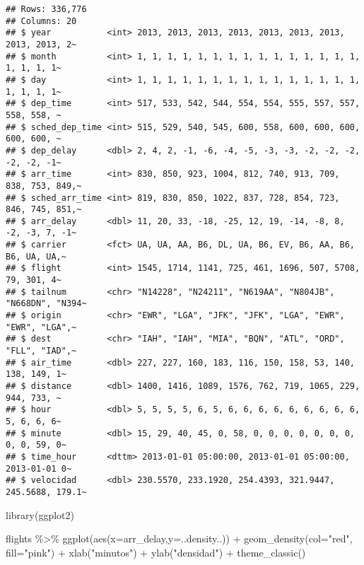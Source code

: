 \documentclass[
]{article}
\newenvironment{Shaded}{\begin{snugshade}}{\end{snugshade}}
\newcommand{\AttributeTok}[1]{\textcolor[rgb]{0.77,0.63,0.00}{#1}}
\newcommand{\FunctionTok}[1]{\textcolor[rgb]{0.00,0.00,0.00}{#1}}
\newcommand{\NormalTok}[1]{#1}
\newcommand{\SpecialCharTok}[1]{\textcolor[rgb]{0.00,0.00,0.00}{#1}}
\newcommand{\StringTok}[1]{\textcolor[rgb]{0.31,0.60,0.02}{#1}}
\begin{document}
\begin{verbatim}
## Rows: 336,776
## Columns: 20
## $ year           <int> 2013, 2013, 2013, 2013, 2013, 2013, 2013, 2013, 2013, 2~
## $ month          <int> 1, 1, 1, 1, 1, 1, 1, 1, 1, 1, 1, 1, 1, 1, 1, 1, 1, 1, 1~
## $ day            <int> 1, 1, 1, 1, 1, 1, 1, 1, 1, 1, 1, 1, 1, 1, 1, 1, 1, 1, 1~
## $ dep_time       <int> 517, 533, 542, 544, 554, 554, 555, 557, 557, 558, 558, ~
## $ sched_dep_time <int> 515, 529, 540, 545, 600, 558, 600, 600, 600, 600, 600, ~
## $ dep_delay      <dbl> 2, 4, 2, -1, -6, -4, -5, -3, -3, -2, -2, -2, -2, -2, -1~
## $ arr_time       <int> 830, 850, 923, 1004, 812, 740, 913, 709, 838, 753, 849,~
## $ sched_arr_time <int> 819, 830, 850, 1022, 837, 728, 854, 723, 846, 745, 851,~
## $ arr_delay      <dbl> 11, 20, 33, -18, -25, 12, 19, -14, -8, 8, -2, -3, 7, -1~
## $ carrier        <fct> UA, UA, AA, B6, DL, UA, B6, EV, B6, AA, B6, B6, UA, UA,~
## $ flight         <int> 1545, 1714, 1141, 725, 461, 1696, 507, 5708, 79, 301, 4~
## $ tailnum        <chr> "N14228", "N24211", "N619AA", "N804JB", "N668DN", "N394~
## $ origin         <chr> "EWR", "LGA", "JFK", "JFK", "LGA", "EWR", "EWR", "LGA",~
## $ dest           <chr> "IAH", "IAH", "MIA", "BQN", "ATL", "ORD", "FLL", "IAD",~
## $ air_time       <dbl> 227, 227, 160, 183, 116, 150, 158, 53, 140, 138, 149, 1~
## $ distance       <dbl> 1400, 1416, 1089, 1576, 762, 719, 1065, 229, 944, 733, ~
## $ hour           <dbl> 5, 5, 5, 5, 6, 5, 6, 6, 6, 6, 6, 6, 6, 6, 6, 5, 6, 6, 6~
## $ minute         <dbl> 15, 29, 40, 45, 0, 58, 0, 0, 0, 0, 0, 0, 0, 0, 0, 59, 0~
## $ time_hour      <dttm> 2013-01-01 05:00:00, 2013-01-01 05:00:00, 2013-01-01 0~
## $ velocidad      <dbl> 230.5570, 233.1920, 254.4393, 321.9447, 245.5688, 179.1~
\end{verbatim}

\begin{Shaded}
\begin{Highlighting}[]
  \FunctionTok{library}\NormalTok{(ggplot2)}

\NormalTok{  flights }\SpecialCharTok{\%\textgreater{}\%}
    \FunctionTok{ggplot}\NormalTok{(}\FunctionTok{aes}\NormalTok{(}\AttributeTok{x=}\NormalTok{arr\_delay,}\AttributeTok{y=}\NormalTok{..density..)) }\SpecialCharTok{+} 
    \FunctionTok{geom\_density}\NormalTok{(}\AttributeTok{col=}\StringTok{"red"}\NormalTok{, }\AttributeTok{fill=}\StringTok{"pink"}\NormalTok{) }\SpecialCharTok{+}
    \FunctionTok{xlab}\NormalTok{(}\StringTok{"minutos"}\NormalTok{) }\SpecialCharTok{+}
    \FunctionTok{ylab}\NormalTok{(}\StringTok{"densidad"}\NormalTok{) }\SpecialCharTok{+}
    \FunctionTok{theme\_classic}\NormalTok{()}
\end{Highlighting}
\end{Shaded}
\end{document}
